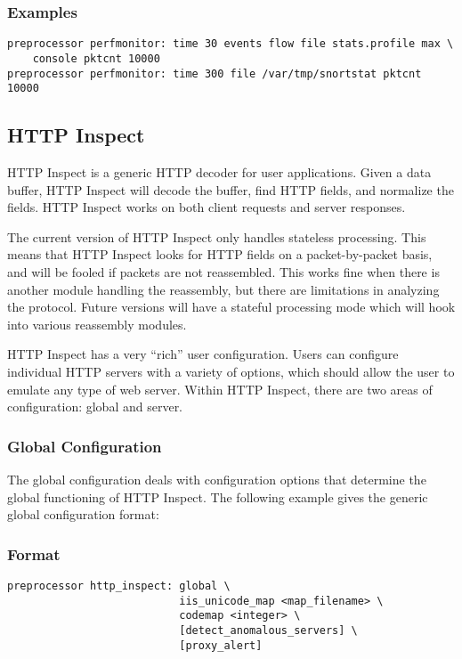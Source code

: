 \documentclass[english]{report}
\begin{document}
\subsubsection{Examples}

\begin{verbatim}
preprocessor perfmonitor: time 30 events flow file stats.profile max \
    console pktcnt 10000 
preprocessor perfmonitor: time 300 file /var/tmp/snortstat pktcnt 10000
\end{verbatim}

\subsection{HTTP Inspect \label{sub:http-inspect}}

HTTP Inspect is a generic HTTP decoder for user applications.  Given a data
buffer, HTTP Inspect will decode the buffer, find HTTP fields, and normalize the
fields.  HTTP Inspect works on both client requests and server responses.

The current version of HTTP Inspect only handles stateless processing.  This
means that HTTP Inspect looks for HTTP fields on a packet-by-packet basis, and
will be fooled if packets are not reassembled.  This works fine when there is
another module handling the reassembly, but there are limitations in analyzing
the protocol.  Future versions will have a stateful processing mode which will
hook into various reassembly modules.

HTTP Inspect has a very ``rich'' user configuration.  Users can configure
individual HTTP servers with a variety of options, which should allow the user
to emulate any type of web server. Within HTTP Inspect, there are two areas of
configuration: global and server.

\subsubsection{Global Configuration}

The global configuration deals with configuration options that determine the
global functioning of HTTP Inspect.  The following example gives the generic
global configuration format:

\subsubsection{Format}
\begin{verbatim}
preprocessor http_inspect: global \
                           iis_unicode_map <map_filename> \
                           codemap <integer> \
                           [detect_anomalous_servers] \
                           [proxy_alert]
\end{verbatim}
\end{document}
